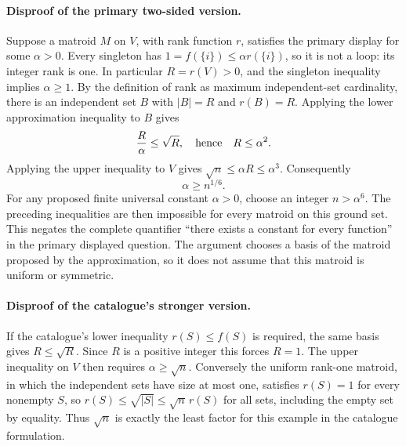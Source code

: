 \documentclass[11pt]{article}
\begin{document}
\paragraph{Disproof of the primary two-sided version.}
Suppose a matroid $M$ on $V$, with rank function $r$, satisfies
the primary display for some $\alpha>0$. Every singleton has
$1=f(\{i\})\le\alpha r(\{i\})$, so it is not a loop:
its integer rank is one. In particular $R=r(V)>0$, and
the singleton inequality implies $\alpha\ge1$.
By the definition of rank as maximum independent-set cardinality,
there is an independent set $B$ with $|B|=R$ and $r(B)=R$.
Applying the lower approximation inequality to $B$ gives
\[
\frac R\alpha\le\sqrt R,
\quad\hbox{hence}\quad R\le\alpha^2.
\]
Applying the upper inequality to $V$ gives
$\sqrt n\le\alpha R\le\alpha^3$. Consequently
\[
\alpha\ge n^{1/6}.
\]
For any proposed finite universal constant $\alpha>0$, choose an
integer $n>\alpha^6$. The preceding inequalities are then impossible
for every matroid on this ground set. This negates the complete
quantifier ``there exists a constant for every function'' in the
primary displayed question. The argument chooses a basis of the
matroid proposed by the approximation, so it does not assume that
this matroid is uniform or symmetric.

\paragraph{Disproof of the catalogue's stronger version.}
If the catalogue's lower inequality $r(S)\le f(S)$ is required,
the same basis gives $R\le\sqrt R$. Since $R$ is a positive
integer this forces $R=1$. The upper inequality on $V$ then
requires $\alpha\ge\sqrt n$. Conversely the uniform rank-one
matroid, in which the independent sets have size at most one,
satisfies $r(S)=1$ for every nonempty $S$, so
$r(S)\le\sqrt{|S|}\le\sqrt n\,r(S)$ for all sets,
including the empty set by equality. Thus $\sqrt n$ is exactly
the least factor for this example in the catalogue formulation.
\end{document}
